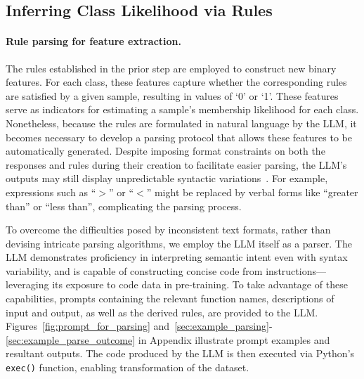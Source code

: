 \subsection{Inferring Class Likelihood via Rules}
\label{Sec:training}

\paragraph{Rule parsing for feature extraction.} The rules established in the prior step are employed to construct new binary features. For each class, these features capture whether the corresponding rules are satisfied by a given sample, resulting in values of ‘0’ or ‘1’. These features serve as indicators for estimating a sample’s membership likelihood for each class. Nonetheless, because the rules are formulated in natural language by the LLM, it becomes necessary to develop a parsing protocol that allows these features to be automatically generated. Despite imposing format constraints on both the responses and rules during their creation to facilitate easier parsing, the LLM’s outputs may still display unpredictable syntactic variations~\cite{kovavc2023large}. For example, expressions such as ``$>$” or ``$<$” might be replaced by verbal forms like ``greater than” or ``less than”, complicating the parsing process.

To overcome the difficulties posed by inconsistent text formats, rather than devising intricate parsing algorithms, we employ the LLM itself as a parser. The LLM demonstrates proficiency in interpreting semantic intent even with syntax variability, and is capable of constructing concise code from instructions—leveraging its exposure to code data in pre-training. To take advantage of these capabilities, prompts containing the relevant function names, descriptions of input and output, as well as the derived rules, are provided to the LLM. Figures~\ref{fig:prompt_for_parsing} and~\ref{sec:example_parsing}-\ref{sec:example_parse_outcome} in Appendix illustrate prompt examples and resultant outputs. The code produced by the LLM is then executed via Python’s \texttt{exec()} function, enabling transformation of the dataset.

\vspace*{-0.12in}
